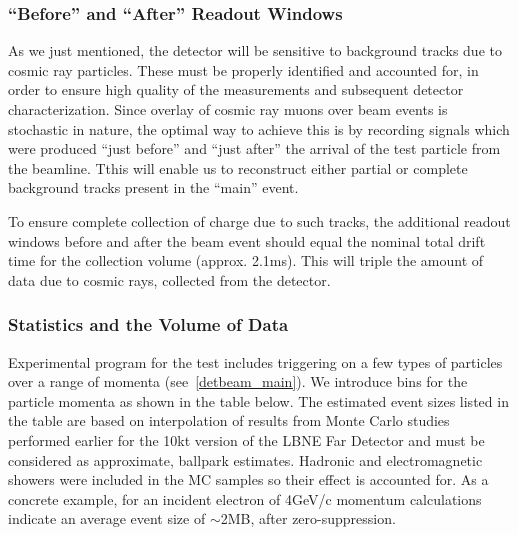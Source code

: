 \subsubsection{``Before'' and ``After'' Readout Windows}
\label{readout_windows}


As we just mentioned, the detector will be sensitive to background tracks due to cosmic ray particles.  These must be properly identified
and accounted for, in order to ensure high quality of the measurements and subsequent detector characterization. Since overlay of cosmic
ray muons over beam events is stochastic in nature, the optimal way to achieve this is by recording signals which were produced ``just before''
and ``just after'' the arrival of the test particle from the beamline. Tthis will enable us to reconstruct either partial or complete background
tracks present in the ``main'' event.

To ensure complete collection of charge due to such tracks, the additional readout windows before and after 
the beam event should equal the nominal total drift time for the collection volume (approx. 2.1ms). This will triple the amount of
data due to cosmic rays, collected from the detector.


\subsubsection{Statistics and the Volume of Data}
\label{bin_table}
Experimental program for the test includes triggering on a few types of particles over a range of momenta (see~\ref{detbeam_main}). We introduce
bins for the particle momenta as shown in the table below. The estimated event sizes listed in the table are based on interpolation of results from
Monte Carlo studies performed earlier for the 10kt version of the LBNE Far Detector and must be considered as approximate, ballpark estimates.
Hadronic and electromagnetic showers were included in the MC samples so their effect is accounted for. As a concrete example, for an incident
electron of 4GeV/c momentum calculations indicate an average event size of $\sim$2MB, after zero-suppression.


